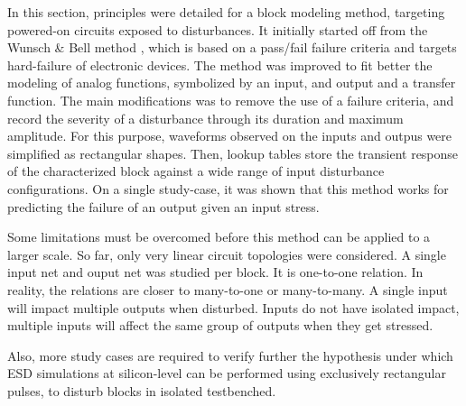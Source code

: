 In this section, principles were detailed for a block modeling method, targeting powered-on circuits exposed to disturbances.
It initially started off from the Wunsch & Bell method \cite{wunsch-bell}, which is based on a pass/fail failure criteria and targets hard-failure of electronic devices.
The method was improved to fit better the modeling of analog functions, symbolized by an input, and output and a transfer function.
The main modifications was to remove the use of a failure criteria, and record the severity of a disturbance through its duration and maximum amplitude.
For this purpose, waveforms observed on the inputs and outpus were simplified as rectangular shapes.
Then, lookup tables store the transient response of the characterized block against a wide range of input disturbance configurations.
On a single study-case, it was shown that this method works for predicting the failure of an output given an input stress.

Some limitations must be overcomed before this method can be applied to a larger scale.
So far, only very linear circuit topologies were considered.
A single input net and ouput net was studied per block.
It is one-to-one relation.
In reality, the relations are closer to many-to-one or many-to-many.
A single input will impact multiple outputs when disturbed.
Inputs do not have isolated impact, multiple inputs will affect the same group of outputs when they get stressed.

Also, more study cases are required to verify further the hypothesis under which ESD simulations at silicon-level can be performed using exclusively rectangular pulses, to disturb blocks in isolated testbenched.


